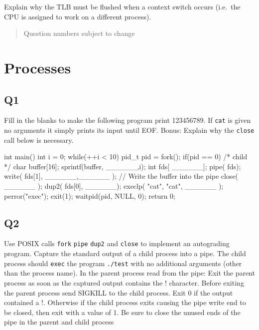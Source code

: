 Explain why the TLB must be flushed when a context switch occurs (i.e.~the CPU is assigned to work on a different process).

\begin{quote}
Question numbers subject to change
\end{quote}

\section{Processes}

\subsection{Q1}\label{q1-3}

Fill in the blanks to make the following program print 123456789. If \texttt{cat} is given no arguments it simply prints its input until EOF. Bonus: Explain why the \texttt{close} call below is necessary.

\begin{code}[language=C]
int main() {
  int i = 0;
  while(++i < 10) {
    pid_t pid = fork();
    if(pid == 0) { /* child */
      char buffer[16];
      sprintf(buffer, ______,i);
      int fds[ ______];
      pipe( fds);
      write( fds[1], ______,______ ); // Write the buffer into the pipe
      close(  ______ );
      dup2( fds[0],  ______);
      execlp( "cat", "cat",  ______ );
      perror("exec"); exit(1);
    }
    waitpid(pid, NULL, 0);
  }
  return 0;
}
\end{code}

\subsection{Q2}\label{q2-3}

Use POSIX calls \texttt{fork} \texttt{pipe} \texttt{dup2} and \texttt{close} to implement an autograding program. Capture the standard output of a child process into a pipe. The child process should \texttt{exec} the program \texttt{./test} with no additional arguments (other than the process name). In the parent process read from the pipe: Exit the parent process as soon as the captured output contains the ! character. Before exiting the parent process send SIGKILL to the child process. Exit 0 if the output contained a !. Otherwise if the child process exits causing the pipe write end to be closed, then exit with a value of 1. Be sure to close the unused ends of the pipe in the parent and child process

